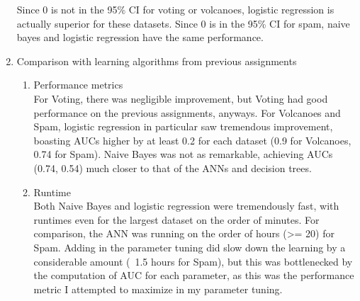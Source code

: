 \documentclass[12pt]{article}
\begin{document}
\begin{enumerate}
        Since 0 is not in the 95\% CI for voting or volcanoes, logistic
        regression is actually superior for these datasets. Since 0 is in the
        95\% CI for spam, naive bayes and logistic regression have the same
        performance.
    \item Comparison with learning algorithms from previous assignments\\
        \begin{enumerate}
            \item Performance metrics\\
                For Voting, there was negligible improvement, but Voting
                had good performance on the previous assignments, anyways.
                For Volcanoes and Spam, logistic regression in particular
                saw tremendous improvement, boasting AUCs higher by at least
                0.2 for each dataset (0.9 for Volcanoes, 0.74 for Spam). Naive
                Bayes was not as remarkable, achieving AUCs (0.74, 0.54) much
                closer to that of the ANNs and decision trees.
            \item Runtime\\
                Both Naive Bayes and logistic regression were tremendously
                fast, with runtimes even for the largest dataset on the order
                of minutes. For comparison, the ANN was running on the order of
                hours (>= 20) for Spam. Adding in the parameter tuning did slow
                down the learning by a considerable amount (~1.5 hours for
                Spam), but this was bottlenecked by the computation of AUC for
                each parameter, as this was the performance metric I attempted
                to maximize in my parameter tuning.


\end{enumerate}
\end{enumerate}
\end{document}

